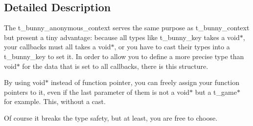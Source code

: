 \subsection{Detailed Description}
The t\-\_\-bunny\-\_\-anonymous\-\_\-context serves the same purpose as t\-\_\-bunny\-\_\-context but present a tiny advantage\-: because all types like t\-\_\-bunny\-\_\-key takes a void$\ast$, your callbacks must all takes a void$\ast$, or you have to cast their types into a t\-\_\-bunny\-\_\-key to set it. In order to allow you to define a more precise type than void$\ast$ for the data that is set to all callbacks, there is this structure.

By using void$\ast$ instead of function pointer, you can freely assign your function pointers to it, even if the last parameter of them is not a void$\ast$ but a t\-\_\-game$\ast$ for example. This, without a cast.

Of course it breaks the type safety, but at least, you are free to choose. 


